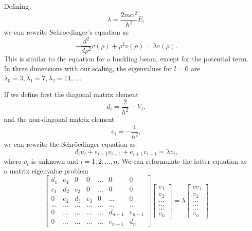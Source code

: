 \documentclass[graybox,envcountchap,sectrefs]{svmult}
\begin{document}
Defining
\[
\lambda = \frac{2m\alpha^2}{\hbar^2}E,
\]
we can rewrite Schroedinger's equation as
\[
  -\frac{d^2}{d\rho^2} v(\rho) + \rho^2v(\rho)  = \lambda v(\rho) .
\]
This is similar to the equation for a buckling beam, except for the
potential term.  In three dimensions with our scaling, the eigenvalues for $l=0$ are
$\lambda_0=3,\lambda_1=7,\lambda_2=11,\dots .$

If we  define first the diagonal matrix element
\[
   d_i=\frac{2}{h^2}+V_i,
\]
and the non-diagonal matrix element
\[
   e_i=-\frac{1}{h^2},
\]
we can rewrite the Schr\"oedinger equation as
\[
d_iu_i+e_{i-1}v_{i-1}+e_{i+1}v_{i+1}  = \lambda v_i,
\]
where $v_i$ is unknown and $i=1,2,\dots, n$. We can reformulate the
latter equation as a matrix eigenvalue problem
\[
    \begin{bmatrix} d_1 & e_1 & 0   & 0    & \dots  &0     & 0 \\
                                e_1 & d_2 & e_2 & 0    & \dots  &0     &0 \\
                                0   & e_2 & d_3 & e_3  &0       &\dots & 0\\
                                \dots  & \dots & \dots & \dots  &\dots      &\dots & \dots\\
                                0   & \dots & \dots & \dots  &\dots       &d_{n-1} & e_{n-1}\\
                                0   & \dots & \dots & \dots  &\dots       &e_{n-1} & d_{n}
             \end{bmatrix}      \begin{bmatrix} v_{1} \\
                                                              v_{2} \\
                                                              \dots\\ \dots\\ \dots\\
                                                              v_{n}
             \end{bmatrix}=\lambda \begin{bmatrix}{c} v_{1} \\
                                                              v_{2} \\
                                                              \dots\\ \dots\\ \dots\\
                                                              v_{n}
             \end{bmatrix}
\]
\end{document}
